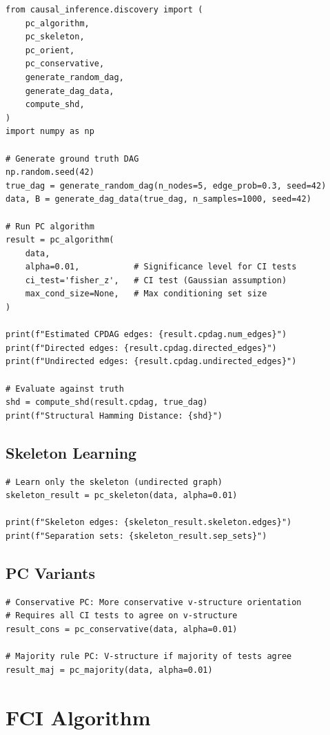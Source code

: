 \begin{verbatim}
from causal_inference.discovery import (
    pc_algorithm,
    pc_skeleton,
    pc_orient,
    pc_conservative,
    generate_random_dag,
    generate_dag_data,
    compute_shd,
)
import numpy as np

# Generate ground truth DAG
np.random.seed(42)
true_dag = generate_random_dag(n_nodes=5, edge_prob=0.3, seed=42)
data, B = generate_dag_data(true_dag, n_samples=1000, seed=42)

# Run PC algorithm
result = pc_algorithm(
    data,
    alpha=0.01,           # Significance level for CI tests
    ci_test='fisher_z',   # CI test (Gaussian assumption)
    max_cond_size=None,   # Max conditioning set size
)

print(f"Estimated CPDAG edges: {result.cpdag.num_edges}")
print(f"Directed edges: {result.cpdag.directed_edges}")
print(f"Undirected edges: {result.cpdag.undirected_edges}")

# Evaluate against truth
shd = compute_shd(result.cpdag, true_dag)
print(f"Structural Hamming Distance: {shd}")
\end{verbatim}

\subsection{Skeleton Learning}

\begin{verbatim}
# Learn only the skeleton (undirected graph)
skeleton_result = pc_skeleton(data, alpha=0.01)

print(f"Skeleton edges: {skeleton_result.skeleton.edges}")
print(f"Separation sets: {skeleton_result.sep_sets}")
\end{verbatim}

\subsection{PC Variants}

\begin{verbatim}
# Conservative PC: More conservative v-structure orientation
# Requires all CI tests to agree on v-structure
result_cons = pc_conservative(data, alpha=0.01)

# Majority rule PC: V-structure if majority of tests agree
result_maj = pc_majority(data, alpha=0.01)
\end{verbatim}


\section{FCI Algorithm}

